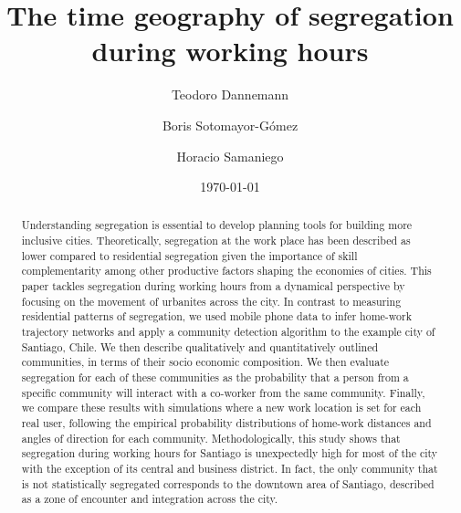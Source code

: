 \documentclass[%
preprint,
 amsmath,amssymb,
pra,
]{revtex4-1}
\begin{document}
\title{The time geography of segregation during working hours}


\author{Teodoro Dannemann}
\author{Boris Sotomayor-G\'omez}
\author{Horacio Samaniego}






\date{\today}
\begin{abstract}
Understanding segregation is essential to develop planning tools for building more inclusive cities. Theoretically, segregation at the work place has been described as lower compared to residential segregation given the importance of skill complementarity among other productive factors shaping the economies of cities. This paper tackles segregation during working hours from a dynamical perspective by focusing on the movement of urbanites across the city. In contrast to measuring residential patterns of segregation, we used mobile phone data to infer home-work trajectory networks and apply a community detection algorithm to the example city of Santiago, Chile. We then describe qualitatively and quantitatively outlined communities, in terms of their socio economic composition. We then evaluate segregation for each of these communities as the probability that a person from a specific community will interact with a co-worker from the same community. Finally, we compare these results with simulations where a new work location is set for each real user, following the empirical probability distributions of home-work distances and angles of direction for each community. Methodologically, this study shows that segregation during working hours for Santiago is unexpectedly high for most of the city with the exception of its central and business district. In fact, the only community that is not statistically segregated corresponds to the downtown area of Santiago, described as a zone of encounter and integration across the city.
\end{abstract}
\end{document}
